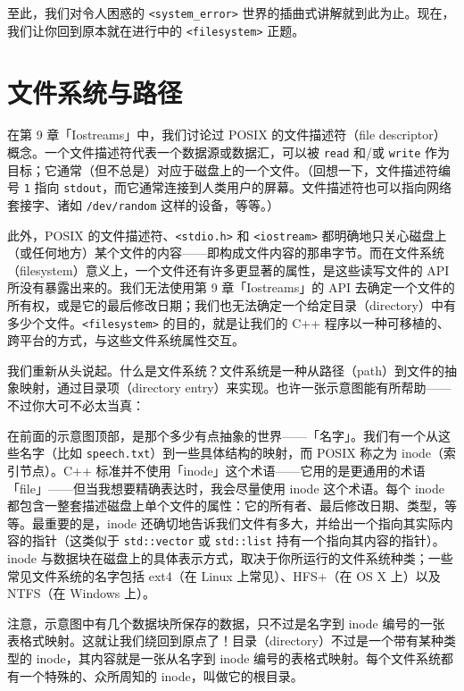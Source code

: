 至此，我们对令人困惑的 \texttt{<system\_\allowbreak{}error>\allowbreak{}} 世界的插曲式讲解就到此为止。现在，我们让你回到原本就在进行中的 \texttt{<filesystem>\allowbreak{}} 正题。

\section{文件系统与路径}

在第 9 章「Iostreams」中，我们讨论过 POSIX 的文件描述符（file descriptor）概念。一个文件描述符代表一个数据源或数据汇，可以被 \texttt{read} 和/或 \texttt{write} 作为目标；它通常（但不总是）对应于磁盘上的一个文件。（回想一下，文件描述符编号 \texttt{1} 指向 \texttt{stdout}，而它通常连接到人类用户的屏幕。文件描述符也可以指向网络套接字、诸如 \texttt{/\allowbreak{}dev/\allowbreak{}random} 这样的设备，等等。）

此外，POSIX 的文件描述符、\texttt{<stdio.\allowbreak{}h>\allowbreak{}} 和 \texttt{<iostream>\allowbreak{}} 都明确地只关心磁盘上（或任何地方）某个文件的内容——即构成文件内容的那串字节。而在文件系统（filesystem）意义上，一个文件还有许多更显著的属性，是这些读写文件的 API 所没有暴露出来的。我们无法使用第 9 章「Iostreams」的 API 去确定一个文件的所有权，或是它的最后修改日期；我们也无法确定一个给定目录（directory）中有多少个文件。\texttt{<filesystem>\allowbreak{}} 的目的，就是让我们的 C++ 程序以一种可移植的、跨平台的方式，与这些文件系统属性交互。

我们重新从头说起。什么是文件系统？文件系统是一种从路径（path）到文件的抽象映射，通过目录项（directory entry）来实现。也许一张示意图能有所帮助——不过你大可不必太当真：


在前面的示意图顶部，是那个多少有点抽象的世界——「名字」。我们有一个从这些名字（比如 \texttt{speech.\allowbreak{}txt}）到一些具体结构的映射，而 POSIX 称之为 inode（索引节点）。C++ 标准并不使用「inode」这个术语——它用的是更通用的术语「file」——但当我想要精确表达时，我会尽量使用 inode 这个术语。每个 inode 都包含一整套描述磁盘上单个文件的属性：它的所有者、最后修改日期、类型，等等。最重要的是，inode 还确切地告诉我们文件有多大，并给出一个指向其实际内容的指针（这类似于 \texttt{std::\allowbreak{}vector} 或 \texttt{std::\allowbreak{}list} 持有一个指向其内容的指针）。inode 与数据块在磁盘上的具体表示方式，取决于你所运行的文件系统种类；一些常见文件系统的名字包括 ext4（在 Linux 上常见）、HFS+（在 OS X 上）以及 NTFS（在 Windows 上）。

注意，示意图中有几个数据块所保存的数据，只不过是名字到 inode 编号的一张表格式映射。这就让我们绕回到原点了！目录（directory）不过是一个带有某种类型的 inode，其内容就是一张从名字到 inode 编号的表格式映射。每个文件系统都有一个特殊的、众所周知的 inode，叫做它的根目录。

